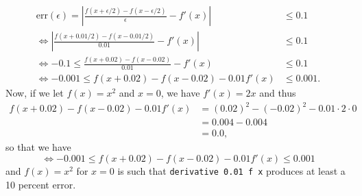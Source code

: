\documentclass{article}
\begin{document}
\begin{itemize}
\begin{equation*}
\begin{split}
            \text{err}(\epsilon) = \left| \frac{f(x + \epsilon/2) - f(x - \epsilon/2)}{\epsilon} - 
            f'(x) \right|
            &\leq 0.1 \\
            \Leftrightarrow \left| \frac{f(x + 0.01/2) - f(x - 0.01/2)}{0.01} - f'(x) \right| 
            &\leq 0.1 \\
            \Leftrightarrow -0.1 \leq \frac{f(x + 0.02) - f(x - 0.02)}{0.01} - f'(x) 
            &\leq 0.1 \\
            \Leftrightarrow -0.001 \leq f(x + 0.02) - f(x - 0.02) - 0.01f'(x) &\leq 0.001.
        \end{split}
    \end{equation*}
    \qquad Now, if we let $f(x) = x^2$ and $x = 0$, we have $f'(x) = 2x$ and thus
    \begin{equation*}
        \begin{split}
            f(x + 0.02) - f(x - 0.02) - 0.01f'(x)
            &= {(0.02)}^2 - (-0.02)^2 - 0.01\cdot2\cdot0 \\
            &= 0.004 - 0.004 \\
            &= 0.0,
        \end{split}
    \end{equation*}
    so that we have
    \[
        \Leftrightarrow -0.001 \leq f(x + 0.02) - f(x - 0.02) - 0.01f'(x) \leq 0.001
    \]
    and $f(x) = x^2$ for $x = 0$ is such that \verb|derivative 0.01 f x| produces at least a 
    10 percent error.
\end{itemize}
\end{document}
